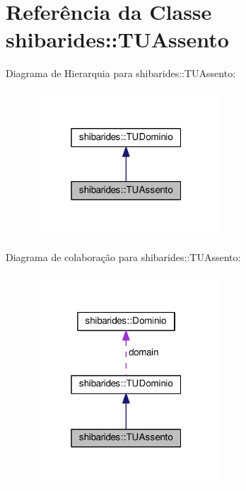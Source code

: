 \hypertarget{classshibarides_1_1TUAssento}{}\section{Referência da Classe shibarides\+:\+:T\+U\+Assento}
\label{classshibarides_1_1TUAssento}


Diagrama de Hierarquia para shibarides\+:\+:T\+U\+Assento\+:\nopagebreak
\begin{figure}[H]
\begin{center}
\leavevmode
\includegraphics[width=196pt]{classshibarides_1_1TUAssento__inherit__graph}
\end{center}
\end{figure}


Diagrama de colaboração para shibarides\+:\+:T\+U\+Assento\+:\nopagebreak
\begin{figure}[H]
\begin{center}
\leavevmode
\includegraphics[width=196pt]{classshibarides_1_1TUAssento__coll__graph}
\end{center}
\end{figure}
